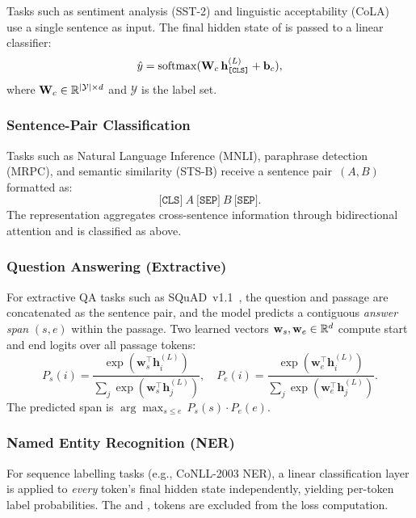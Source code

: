 Tasks such as sentiment analysis (SST-2) and linguistic acceptability
(CoLA)~\cite{wang2018glue} use a single sentence as input.  The final hidden state
of \cls{} is passed to a linear classifier:
\begin{equation}
  \hat{y} = \operatorname{softmax}(\mathbf{W}_c\,\mathbf{h}_{\texttt{[CLS]}}^{(L)} + \mathbf{b}_c),
  \label{eq:cls}
\end{equation}
where $\mathbf{W}_c \in \mathbb{R}^{|\mathcal{Y}| \times d}$ and $\mathcal{Y}$ is the
label set.

\subsubsection{Sentence-Pair Classification}
\label{ssubsec:pair_cls}

Tasks such as Natural Language Inference (MNLI), paraphrase detection (MRPC), and
semantic similarity (STS-B) receive a sentence pair~$(A, B)$ formatted as:
\[
  \texttt{[CLS]}\ A\ \texttt{[SEP]}\ B\ \texttt{[SEP]}.
\]
The \cls{} representation aggregates cross-sentence information through
bidirectional attention and is classified as above.

\subsubsection{Question Answering (Extractive)}
\label{ssubsec:qa}

For extractive QA tasks such as SQuAD~v1.1~\cite{rajpurkar2016squad}, the
question and passage are concatenated as the sentence pair, and the model predicts
a contiguous \emph{answer span} $(s, e)$ within the passage.  Two learned vectors
$\mathbf{w}_s, \mathbf{w}_e \in \mathbb{R}^d$ compute start and end logits over all
passage tokens:
\begin{equation}
  P_s(i) = \frac{\exp(\mathbf{w}_s^\top \mathbf{h}_i^{(L)})}
                 {\sum_j \exp(\mathbf{w}_s^\top \mathbf{h}_j^{(L)})}, \quad
  P_e(i) = \frac{\exp(\mathbf{w}_e^\top \mathbf{h}_i^{(L)})}
                 {\sum_j \exp(\mathbf{w}_e^\top \mathbf{h}_j^{(L)})}.
  \label{eq:qa}
\end{equation}
The predicted span is $\arg\max_{s \leq e}\, P_s(s) \cdot P_e(e)$.

\subsubsection{Named Entity Recognition (NER)}
\label{ssubsec:ner}

For sequence labelling tasks (e.g., CoNLL-2003 NER), a linear classification
layer is applied to \emph{every} token's final hidden state independently, yielding
per-token label probabilities.  The \cls{} and \sep{} tokens are excluded from the
loss computation.

